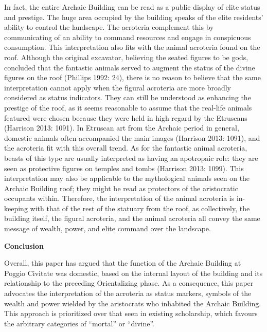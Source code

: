 In fact, the entire Archaic Building can be read as a public display of
elite status and prestige. The huge area occupied by the building speaks
of the elite residents' ability to control the landscape. The acroteria
complement this by communicating of an ability to command resources and
engage in conspicuous consumption. This interpretation also fits with
the animal acroteria found on the roof. Although the original excavator,
believing the seated figures to be gods, concluded that the fantastic
animals served to augment the status of the divine figures on the roof
(Phillips 1992: 24), there is no reason to believe that the same
interpretation cannot apply when the figural acroteria are more broadly
considered as status indicators. They can still be understood as
enhancing the prestige of the roof, as it seems reasonable to assume
that the real-life animals featured were chosen because they were held
in high regard by the Etruscans (Harrison 2013: 1091). In Etruscan art
from the Archaic period in general, domestic animals often accompanied
the main images (Harrison 2013: 1091), and the acroteria fit with this
overall trend. As for the fantastic animal acroteria, beasts of this
type are usually interpreted as having an apotropaic role: they are seen
as protective figures on temples and tombs (Harrison 2013: 1099). This
interpretation may also be applicable to the mythological animals seen
on the Archaic Building roof; they might be read as protectors of the
aristocratic occupants within. Therefore, the interpretation of the
animal acroteria is in-keeping with that of the rest of the statuary
from the roof, as collectively, the building itself, the figural
acroteria, and the animal acroteria all convey the same message of
wealth, power, and elite command over the landscape.

\textbf{Conclusion}

Overall, this paper has argued that the function of the Archaic Building
at Poggio Civitate was domestic, based on the internal layout of the
building and its relationship to the preceding Orientalizing phase. As a
consequence, this paper advocates the interpretation of the acroteria as
status markers, symbols of the wealth and power wielded by the
aristocrats who inhabited the Archaic Building. This approach is
prioritized over that seen in existing scholarship, which favours the
arbitrary categories of ``mortal'' or ``divine''.
